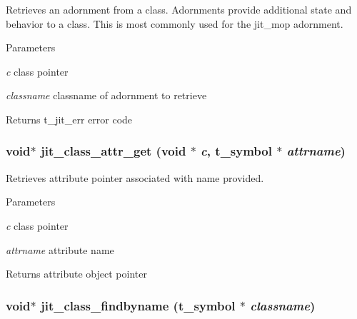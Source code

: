 Retrieves an adornment from a class. Adornments provide additional state and behavior to a class. This is most commonly used for the jit\_\-mop adornment.


\begin{DoxyParams}{Parameters}
\item[{\em c}]class pointer \item[{\em classname}]classname of adornment to retrieve\end{DoxyParams}
\begin{DoxyReturn}{Returns}
t\_\-jit\_\-err error code 
\end{DoxyReturn}
\hypertarget{group__classmod_gaf35d0b9ca105219561cb18114f4002ef}{
\subsubsection[{jit\_\-class\_\-attr\_\-get}]{\setlength{\rightskip}{0pt plus 5cm}void$\ast$ jit\_\-class\_\-attr\_\-get (void $\ast$ {\em c}, \/  {\bf t\_\-symbol} $\ast$ {\em attrname})}}
\label{group__classmod_gaf35d0b9ca105219561cb18114f4002ef}


Retrieves attribute pointer associated with name provided. 
\begin{DoxyParams}{Parameters}
\item[{\em c}]class pointer \item[{\em attrname}]attribute name\end{DoxyParams}
\begin{DoxyReturn}{Returns}
attribute object pointer 
\end{DoxyReturn}
\hypertarget{group__classmod_ga63eb9d25f881cd6fba11e24f9ac9b02f}{
\subsubsection[{jit\_\-class\_\-findbyname}]{\setlength{\rightskip}{0pt plus 5cm}void$\ast$ jit\_\-class\_\-findbyname ({\bf t\_\-symbol} $\ast$ {\em classname})}}
\label{group__classmod_ga63eb9d25f881cd6fba11e24f9ac9b02f}


